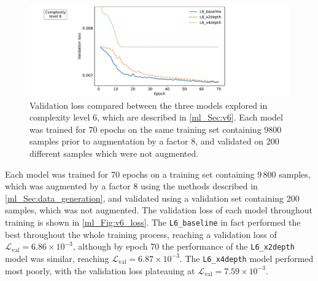 \begin{figure}[tp]
\includegraphics[width=\textwidth]{v6_loss}
\caption{Validation loss compared between the three models explored in complexity level 6, which are described in \autoref{ml_Sec:v6}. Each model was trained for 70 epochs on the same training set containing 9800 samples prior to augmentation by a factor 8, and validated on 200 different samples which were not augmented.}
\label{ml_Fig:v6_loss}
\end{figure}

Each model was trained for 70 epochs on a training set containing 9\,800 samples, which was augmented by a factor 8 using the methods described in \autoref{ml_Sec:data_generation}, and validated using a validation set containing 200 samples, which was not augmented. The validation loss of each model throughout training is shown in \autoref{ml_Fig:v6_loss}. The \texttt{L6\_baseline} in fact performed the best throughout the whole training process, reaching a validation loss of $\mathcal{L}_\text{val} = 6.86 \times 10^{-3}$, although by epoch 70 the performance of the \texttt{L6\_x2depth} model was similar, reaching $\mathcal{L}_\text{val} = 6.87 \times 10^{-3}$. The \texttt{L6\_x4depth} model performed most poorly, with the validation loss plateauing at $\mathcal{L}_\text{val} = 7.59 \times 10^{-3}$.

